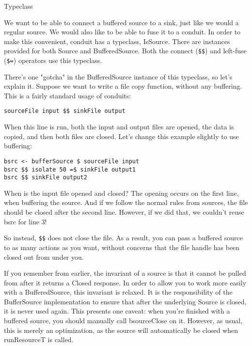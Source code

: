 Typeclass

We want to be able to connect a buffered source to a sink, just like we would a regular
source.
We would also like to be able to fuse it to a conduit. In order to make this convenient,
conduit
has a typeclass, IsSource. There are instances provided for both
Source and BufferedSource. Both the connect
(\verb#$$#) and left-fuse (\verb#$=#) operators use this typeclass.

There's one "gotcha" in the BufferedSource instance of this typeclass, so
let's explain it. Suppose we want to write a file copy function, without any buffering.
This is a
fairly standard usage of conduits:
\begin{lstlisting}
sourceFile input $$ sinkFile output
\end{lstlisting}
When this line is run, both the input and output files are opened, the data is copied, and
then
both files are closed. Let's change this example slightly to use buffering:
\begin{lstlisting}
bsrc <- bufferSource $ sourceFile input
bsrc $$ isolate 50 =$ sinkFile output1
bsrc $$ sinkFile output2
\end{lstlisting}
When is the input file opened and closed? The opening occurs on the first line, when
buffering
the source. And if we follow the normal rules from sources, the file should be closed
after the
second line. However, if we did that, we couldn't reuse bsrc for line 3!

So instead, \verb#$$# does not close the file. As a result, you can pass a
buffered source to as many actions as you want, without concerns that the file handle has
been
closed out from under you.

If you remember from earlier, the invariant of a source is that it cannot be pulled from
after it returns a Closed response. In order to allow you to work more easily
with a BufferedSource, this invariant is relaxed. It is the responsibility of
the BufferSource implementation to ensure that after the underlying
Source is closed, it is never used again.
This presents one caveat: when you're finished with a buffered source, you should manually
call
bsourceClose on it. However, as usual, this is merely an optimization, as the
source will automatically be closed when runResourceT is called.

